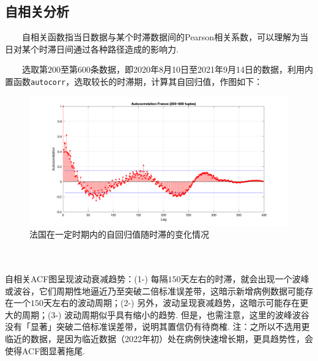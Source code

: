 \documentclass[a4paper, titlepage]{article}
\begin{document}
    \subsection{自相关分析}
    　　自相关函数指当日数据与某个时滞数据间的Pearson相关系数，可以理解为当日对某个时滞日间通过各种路径造成的影响力.

    　　选取第$200$至第$600$条数据，即2020年8月10日至2021年9月14日的数据，利用内置函数\texttt{autocorr}，选取较长的时滞期，计算其自回归值，作图如下：\\
    \begin{minipage}{\textwidth}
        \begin{figure}[H]
            \centering
            \includegraphics[width=\textwidth]{./images/France_ACF.png}
            \vspace{-3em}
            \caption{法国在一定时期内的自回归值随时滞的变化情况}
            \label{images:France_ACF}
        \end{figure}
    \end{minipage}\\\quad\\
    自相关ACF图呈现波动衰减趋势：(1-) 每隔$150$天左右的时滞，就会出现一个波峰或波谷，它们周期性地逼近乃至突破二倍标准误差带，这暗示新增病例数据可能存在一个$150$天左右的波动周期；(2-) 另外，波动呈现衰减趋势，这暗示可能存在更大的周期；(3-) 波动周期似乎具有缩小的趋势. 但是，也需注意，这里的波峰波谷没有「显著」突破二倍标准误差带，说明其置信仍有待商榷. {\kaishu 注：之所以不选用更临近的数据，是因为临近数据（2022年初）处在病例快速增长期，更具趋势性，会使得ACF图显著拖尾.}
\end{document}
